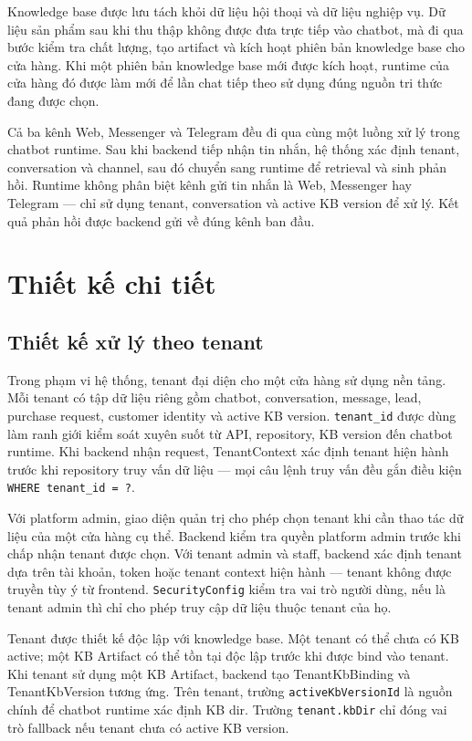 \documentclass[../DoAn.tex]{subfiles}
\begin{document}
Knowledge base được lưu tách khỏi dữ liệu hội thoại và dữ liệu nghiệp vụ. Dữ liệu sản phẩm sau khi thu thập không được đưa trực tiếp vào chatbot, mà đi qua bước kiểm tra chất lượng, tạo artifact và kích hoạt phiên bản knowledge base cho cửa hàng. Khi một phiên bản knowledge base mới được kích hoạt, runtime của cửa hàng đó được làm mới để lần chat tiếp theo sử dụng đúng nguồn tri thức đang được chọn.

Cả ba kênh Web, Messenger và Telegram đều đi qua cùng một luồng xử lý trong chatbot runtime. Sau khi backend tiếp nhận tin nhắn, hệ thống xác định tenant, conversation và channel, sau đó chuyển sang runtime để retrieval và sinh phản hồi. Runtime không phân biệt kênh gửi tin nhắn là Web, Messenger hay Telegram — chỉ sử dụng tenant, conversation và active KB version để xử lý. Kết quả phản hồi được backend gửi về đúng kênh ban đầu.

\section{Thiết kế chi tiết}
\label{section:4.2}

\subsection{Thiết kế xử lý theo tenant}
\label{subsection:4.2.1}

Trong phạm vi hệ thống, tenant đại diện cho một cửa hàng sử dụng nền tảng. Mỗi tenant có tập dữ liệu riêng gồm chatbot, conversation, message, lead, purchase request, customer identity và active KB version. \texttt{tenant\_id} được dùng làm ranh giới kiểm soát xuyên suốt từ API, repository, KB version đến chatbot runtime. Khi backend nhận request, TenantContext xác định tenant hiện hành trước khi repository truy vấn dữ liệu — mọi câu lệnh truy vấn đều gắn điều kiện \texttt{WHERE tenant\_id = ?}.

Với platform admin, giao diện quản trị cho phép chọn tenant khi cần thao tác dữ liệu của một cửa hàng cụ thể. Backend kiểm tra quyền platform admin trước khi chấp nhận tenant được chọn. Với tenant admin và staff, backend xác định tenant dựa trên tài khoản, token hoặc tenant context hiện hành — tenant không được truyền tùy ý từ frontend. \texttt{SecurityConfig} kiểm tra vai trò người dùng, nếu là tenant admin thì chỉ cho phép truy cập dữ liệu thuộc tenant của họ.

Tenant được thiết kế độc lập với knowledge base. Một tenant có thể chưa có KB active; một KB Artifact có thể tồn tại độc lập trước khi được bind vào tenant. Khi tenant sử dụng một KB Artifact, backend tạo TenantKbBinding và TenantKbVersion tương ứng. Trên tenant, trường \texttt{activeKbVersionId} là nguồn chính để chatbot runtime xác định KB dir. Trường \texttt{tenant.kbDir} chỉ đóng vai trò fallback nếu tenant chưa có active KB version.
\end{document}
